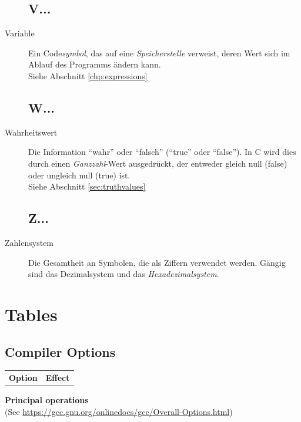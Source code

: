 \begin{appendices}
\begin{description}
\section*{V...}
\item[Variable] Ein Code\emph{symbol}, das auf eine \emph{Speicherstelle} verweist, deren Wert sich
	im Ablauf des Programms ändern kann.\\
	Siehe Abschnitt \ref{chp:expressions}

\section*{W...}
\item[Wahrheitswert] Die Information \enquote{wahr} oder \enquote{falsch} (\enquote{true} oder
	\enquote{false}). In C wird dies durch einen \emph{Ganzzahl}-Wert ausgedrückt, der entweder gleich
	null (false) oder ungleich null (true) ist.\\
	Siehe Abschnitt \ref{sec:truthvalues}

\section*{Z...}
\item[Zahlensystem] Die Gesamtheit an Symbolen, die als Ziffern verwendet werden. Gängig sind das
	Dezimalsystem und das \emph{Hexadezimalsystem}.
\end{description}



\chapter{Tables}
\section{Compiler Options}
{

\begin{tabularx}
	{\linewidth}
	{OE}
	\toprule[1.5pt]

	\normalfont	\bfseries Option &
				\bfseries Effect
	\tabcrlf
\end{tabularx}

\vspace{12pt}
\textbf{Principal operations} \\
(See \url{https://gcc.gnu.org/onlinedocs/gcc/Overall-Options.html})

}
\end{appendices}
